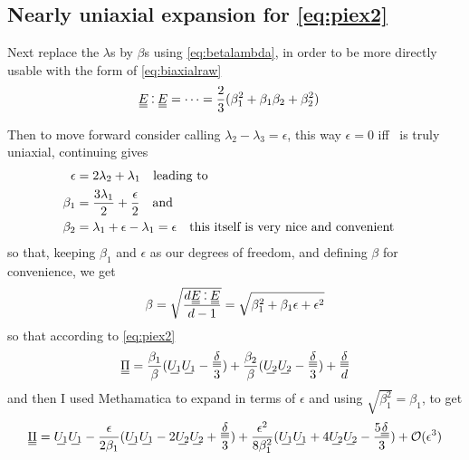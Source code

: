 \documentclass[11pt]{article}
\begin{document}
\subsection{Nearly uniaxial expansion for \cref{eq:piex2}}
Next replace the $\lambda$s by $\beta$s using \cref{eq:betalambda}, in order to be more directly usable with the form of \cref{eq:biaxialraw}
\begin{align}
    \du{E} \cddot \du{E} &= \cdots = \frac{2}{3}(\beta_1^2 + \beta_1\beta_2 + \beta_2^2)
\end{align}

Then to move forward consider calling $\lambda_2-\lambda_3=\epsilon$, this way $\epsilon=0$ iff \EE\ is truly uniaxial, continuing gives
\begin{align}
    \epsilon &= 2\lambda_2 +\lambda_1 \qq{leading to} \\
    \beta_1 &= \frac{3\lambda_1}{2} + \frac{\epsilon}{2} \qq{and} \\
    \beta_2 &= \lambda_1 + \epsilon - \lambda_1 = \epsilon \qq{this itself is very nice and convenient}
\end{align}
\noindent{}
so that, keeping $\beta_1$ and $\epsilon$ as our degrees of freedom, and defining $\beta$ for convenience, we get
\begin{equation}
    \beta = \sqrt{\frac{d\du{E}\cddot\du{E}}{d-1}} = \sqrt{\beta_1^2+\beta_1\epsilon+\epsilon^2}
\end{equation}
so that according to \cref{eq:piex2}
\begin{equation}
    \du{\Pi} = \frac{\beta_1}{\beta}(\su{U_1}\su{U_1} - \frac{\du{\delta}}{3}) + \frac{\beta_2}{\beta}(\su{U_2}\su{U_2} - \frac{\du{\delta}}{3}) + \frac{\du{\delta}}{d}
\end{equation}
and then I used Methamatica to expand in terms of $\epsilon$ and using $\sqrt{\beta_1^2}=\beta_1$, to get
\begin{equation}
    \du{\Pi} = \su{U_1}\su{U_1} - \frac{\epsilon}{2\beta_1}(\su{U_1}\su{U_1} - 2\su{U_2}\su{U_2} + \frac{\du{\delta}}{3}) + \frac{\epsilon^2}{8\beta_1^2}(\su{U_1}\su{U_1} + 4\su{U_2}\su{U_2} - \frac{5\du{\delta}}{3}) + \mathcal{O}(\epsilon^3)
\end{equation}
\end{document}
